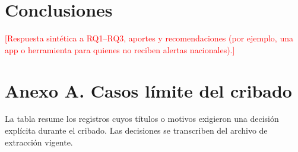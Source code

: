 \documentclass[12pt,a4paper]{article}
\newcommand{\relleno}[1]{\textcolor{red}{[#1]}}
\begin{document}
\section{Conclusiones}
\relleno{Respuesta sintética a RQ1--RQ3, aportes y recomendaciones (por ejemplo, una app o herramienta para quienes no reciben alertas nacionales).}

\clearpage
\appendix
\section{Anexo A. Casos límite del cribado}
La tabla resume los registros cuyos títulos o motivos exigieron una decisión explícita durante el cribado. Las decisiones se transcriben del archivo de extracción vigente.
\end{document}

